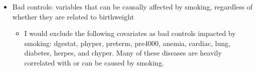 \documentclass{article}
\begin{document}
\begin{enumerate}[(a)]
\begin{itemize}
\begin{itemize}
            \item Paternal Demographics: dfage, dfeduc, orfath
            \item Pregnancy History: nlbnl, dlivord,totord9, isllb10, csex
            \item Prenatal Care: monpre, nprevist, adequacy
            \item Substance Use: alcohol, drink5
        \end{itemize}
        \item Bad controls: variables that can be causally affected by smoking, regardless of whether they are related to birthweight  
        \begin{itemize}
            \item I would exclude the following covariates as bad controls impacted by smoking: dgestat, phyper, preterm, pre4000, anemia, cardiac, lung, diabetes, herpes, and chyper. Many of these diseases are heavily correlated with or can be caused by smoking.
        \end{itemize}
    \end{itemize}
\end{enumerate}
\end{document}
